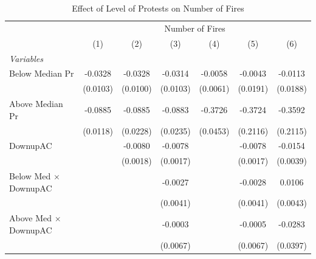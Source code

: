 
\begin{table}[htbp]
   \caption{\label{tab:protest_treat_main} Effect of Level of Protests on Number of Fires}
   \centering
   \begin{tabular}{lcccccc}
      \tabularnewline \midrule \midrule
       & \multicolumn{6}{c}{Number of Fires}\\
                                                              & (1)           & (2)           & (3)           & (4)           & (5)           & (6)\\  
      \midrule
      \emph{Variables}\\
      Below Median Pr                                         & -0.0328       & -0.0328       & -0.0314       & -0.0058       & -0.0043       & -0.0113\\   
                                                              & (0.0103)      & (0.0100)      & (0.0103)      & (0.0061)      & (0.0191)      & (0.0188)\\   
      Above Median Pr                                         & -0.0885       & -0.0885       & -0.0883       & -0.3726       & -0.3724       & -0.3592\\   
                                                              & (0.0118)      & (0.0228)      & (0.0235)      & (0.0453)      & (0.2116)      & (0.2115)\\   
      DownupAC                                                &               & -0.0080       & -0.0078       &               & -0.0078       & -0.0154\\   
                                                              &               & (0.0018)      & (0.0017)      &               & (0.0017)      & (0.0039)\\   
      Below Med $\times$ DownupAC                             &               &               & -0.0027       &               & -0.0028       & 0.0106\\   
                                                              &               &               & (0.0041)      &               & (0.0041)      & (0.0043)\\   
      Above Med $\times$ DownupAC                             &               &               & -0.0003       &               & -0.0005       & -0.0283\\   
                                                              &               &               & (0.0067)      &               & (0.0067)      & (0.0397)\\   

\end{tabular}
\end{table}
